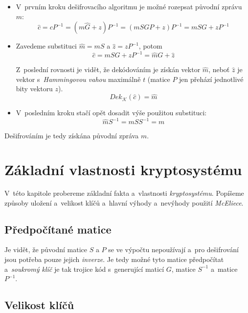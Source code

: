 \documentclass[thesis=M,czech,hidelinks]{FITthesis}[2012/06/26]
\newcommand{\0}{{\textcolor[gray]{0.75}{0}}}
\begin{document}
\begin{itemize}
    \item V~prvním kroku dešifrovacího algoritmu je možné rozepsat původní
        zprávu~$m$:
        $$
            \hat{c} = c P^{-1} = \left( m \hat{G} + z \right) P^{-1} =
            \left(m S G P + z \right) P^{-1} = m S G + z P^{-1}
        $$

    \item Zavedeme substituci $\hat{m} = m S$ a $\hat{z} = z P^{-1}$, potom
        $$ \hat{c} = m S G + z P^{-1} = \hat{m} G + \hat{z} $$

        Z~poslední rovnosti je vidět, že dekódováním je získán vektor $\hat{m}$,
        neboť $\hat{z}$ je vektor s~\emph{Hammingovou vahou} maximálně $t$
        (matice $P$ jen přehází jednotlivé bity vektoru $z$).
        $$ Dek_{\mathcal{K}}\left(\hat{c}\right) = \hat{m} $$

    \item V~posledním kroku stačí opět dosadit výše použitou substituci:
        $$ \hat{m} S^{-1} = m S S^{-1} = m $$

\end{itemize}

Dešifrováním je tedy získána původní zpráva $m$.



\section{Základní vlastnosti kryptosystému}\label{kap_mceliece_vlastnosti}

V~této kapitole probereme základní fakta a~vlastnosti \emph{kryptosystému}.
Popíšeme způsoby uložení a~velikost klíčů a~hlavní výhody a~nevýhody použití
\emph{McEliece}.


\subsection{Předpočítané matice}

Je vidět, že původní matice $S$ a $P$ se ve výpočtu nepoužívají a~pro
dešifrování jsou potřeba pouze jejich \emph{inverze}. Je tedy možné tyto matice
předpočítat a~\emph{soukromý klíč} je tak trojice kód s~generující maticí $G$,
matice $S^{-1}$ a~matice~$P^{-1}$.


\subsection{Velikost klíčů}\label{kap_velikost_klicu}
\end{document}
